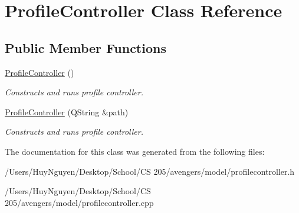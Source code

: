 \hypertarget{classProfileController}{}\section{Profile\+Controller Class Reference}
\label{classProfileController}
\subsection*{Public Member Functions}
\begin{DoxyCompactItemize}
\item 
\hyperlink{classProfileController_ac2770250ea6c03d42325f81fcaf0f076}{Profile\+Controller} ()\hypertarget{classProfileController_ac2770250ea6c03d42325f81fcaf0f076}{}\label{classProfileController_ac2770250ea6c03d42325f81fcaf0f076}

\begin{DoxyCompactList}\small\item\em Constructs and runs profile controller. \end{DoxyCompactList}\item 
\hyperlink{classProfileController_ac861647f56027348166dda0a1b15bc5e}{Profile\+Controller} (Q\+String \&path)\hypertarget{classProfileController_ac861647f56027348166dda0a1b15bc5e}{}\label{classProfileController_ac861647f56027348166dda0a1b15bc5e}

\begin{DoxyCompactList}\small\item\em Constructs and runs profile controller. \end{DoxyCompactList}\end{DoxyCompactItemize}


The documentation for this class was generated from the following files\+:\begin{DoxyCompactItemize}
\item 
/\+Users/\+Huy\+Nguyen/\+Desktop/\+School/\+C\+S 205/avengers/model/profilecontroller.\+h\item 
/\+Users/\+Huy\+Nguyen/\+Desktop/\+School/\+C\+S 205/avengers/model/profilecontroller.\+cpp\end{DoxyCompactItemize}
